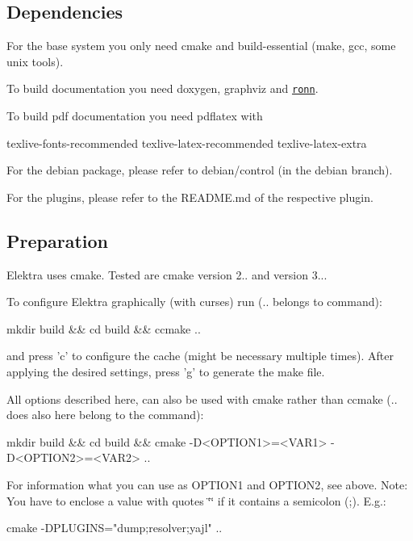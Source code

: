 \subsection*{Dependencies}

For the base system you only need cmake and build-\/essential (make, gcc, some unix tools).

To build documentation you need doxygen, graphviz and \href{https://github.com/rtomayko/ronn/blob/master/INSTALLING#files}{\tt ronn}.

To build pdf documentation you need pdflatex with \begin{DoxyVerb}texlive-fonts-recommended
texlive-latex-recommended
texlive-latex-extra
\end{DoxyVerb}


For the debian package, please refer to debian/control (in the debian branch).

For the plugins, please refer to the R\+E\+A\+D\+M\+E.\+md of the respective plugin.

\subsection*{Preparation}

Elektra uses cmake. Tested are cmake version 2.. and version 3...

To configure Elektra graphically (with curses) run ({\ttfamily ..} belongs to command)\+: \begin{DoxyVerb}mkdir build && cd build && ccmake ..
\end{DoxyVerb}


and press 'c' to configure the cache (might be necessary multiple times). After applying the desired settings, press 'g' to generate the make file.

All options described here, can also be used with cmake rather than ccmake ({\ttfamily ..} does also here belong to the command)\+: \begin{DoxyVerb}mkdir build && cd build && cmake -D<OPTION1>=<VAR1> -D<OPTION2>=<VAR2> ..
\end{DoxyVerb}


For information what you can use as {\ttfamily O\+P\+T\+I\+O\+N1} and {\ttfamily O\+P\+T\+I\+O\+N2}, see above. Note\+: You have to enclose a value with quotes {\ttfamily \char`\"{}\char`\"{}} if it contains a semicolon ({\ttfamily ;}). E.\+g.\+: \begin{DoxyVerb}cmake -DPLUGINS="dump;resolver;yajl" ..
\end{DoxyVerb}


